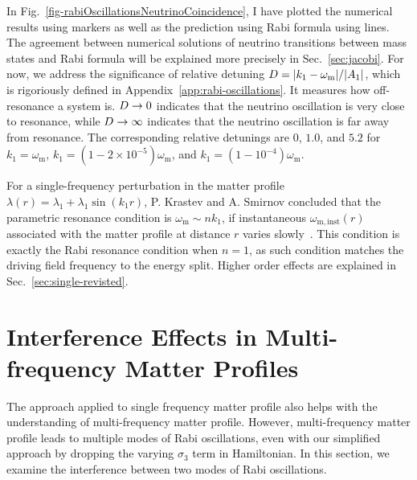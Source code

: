 In Fig.~\ref{fig-rabiOscillationsNeutrinoCoincidence}, I have plotted the numerical results using markers as well as the prediction using Rabi formula using lines. The agreement between numerical solutions of neutrino transitions between mass states and Rabi formula will be explained more precisely in Sec.~\ref{sec:jacobi}. For now, we address the significance of relative detuning $D = \lvert k_1 - \omega_{\mathrm m} \rvert /\lvert A_1 \rvert$,  which is rigoriously defined in Appendix~\ref{app:rabi-oscillations}. It measures how off-resonance a system is. $D\to 0$ indicates that the neutrino oscillation is very close to resonance, while $D\to \infty$ indicates that the neutrino oscillation is far away from resonance. The corresponding relative detunings are $0$, $1.0$, and $5.2$ for $k_1=\omega_{\mathrm{m}}$, $k_1=(1-2\times 10^{-5})\omega_{\mathrm m}$, and $k_1=(1-10^{-4})\omega_{\mathrm m}$.


For a single-frequency perturbation in the matter profile $\lambda(r) =\lambda_1 +  \lambda_1\sin(k_1 r)$, P. Krastev and A. Smirnov concluded that the parametric resonance condition is $\omega_{\mathrm{m}} \sim n k_1$, if instantaneous $\omega_{\mathrm{m,inst}}(r)$ associated with the matter profile at distance $r$ varies slowly~\cite{Krastev1989}. This condition is exactly the Rabi resonance condition when $n=1$, as such condition matches the driving field frequency to the energy split. Higher order effects are explained in Sec.~\ref{sec:single-revisted}.





\section{\label{sec:multiple}Interference Effects in Multi-frequency Matter Profiles}


The approach applied to single frequency matter profile also helps with the understanding of multi-frequency matter profile. However, multi-frequency matter profile leads to multiple modes of Rabi oscillations, even with our simplified approach by dropping the varying $\sigma_3$ term in Hamiltonian. In this section, we examine the interference between two modes of Rabi oscillations.






